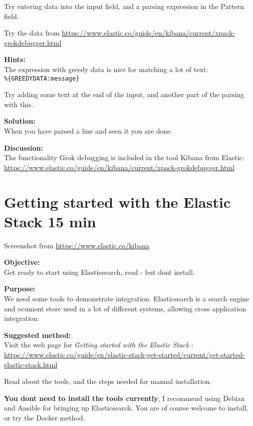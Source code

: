 \documentclass[a4paper,11pt,notitlepage]{report}
\begin{document}
Try entering data into the input field, and a parsing expression in the Pattern field.

Try the data from
\url{https://www.elastic.co/guide/en/kibana/current/xpack-grokdebugger.html}



{\bf Hints:}\\
The expression with greedy data is nice for matching a lot of text:\\
\verb+%{GREEDYDATA:message}+

Try adding some text at the end of the input, and another part of the parsing with this.

{\bf Solution:}\\
When you have parsed a line and seen it you are done.

{\bf Discussion:}\\
The functionality Grok debugging is included in the tool Kibana from Elastic:\\
\url{https://www.elastic.co/guide/en/kibana/current/xpack-grokdebugger.html}


\chapter{Getting started with the Elastic Stack 15 min}
\label{gettingstartedelastic}


Screenshot from \url{https://www.elastic.co/kibana}

{\bf Objective:}\\
Get ready to start using Elasticsearch, read - but dont install.

{\bf Purpose:}\\
We need some tools to demonstrate integration. Elasticsearch is a search engine and ocument store used in a lot of different systems, allowing cross application integration.


{\bf Suggested method:}\\
Visit the web page for \emph{Getting started with the Elastic Stack} :\\
{\footnotesize\url{https://www.elastic.co/guide/en/elastic-stack-get-started/current/get-started-elastic-stack.html}}

Read about the tools, and the steps needed for manual installation.

{\bf You dont need to install the tools currently}, I recommend using Debian and Ansible for bringing up Elasticsearch.
You are of course welcome to install, or try the Docker method.
\end{document}
